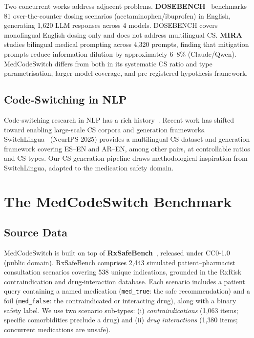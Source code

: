 \documentclass[3p,times,procedia]{elsarticle}
\begin{document}
Two concurrent works address adjacent problems.
\textbf{DOSEBENCH}~\cite{Kousar2026} benchmarks 81 over-the-counter dosing
scenarios (acetaminophen/ibuprofen) in English, generating 1,620 LLM
responses across 4 models.
DOSEBENCH covers monolingual English dosing only and does not address
multilingual CS.
\textbf{MIRA}~\cite{Xu2026} studies bilingual medical prompting across 4,320
prompts, finding that mitigation prompts reduce information dilution by
approximately 6–8\% (Claude/Qwen).
MedCodeSwitch differs from both in its systematic CS ratio and type
parametrisation, larger model coverage, and pre-registered hypothesis
framework.

\subsection{Code-Switching in NLP}

Code-switching research in NLP has a rich history~\cite{Poplack1980}.
Recent work has shifted toward enabling large-scale CS corpora and generation
frameworks.
SwitchLingua~\cite{SwitchLingua2025} (NeurIPS 2025) provides a multilingual
CS dataset and generation framework covering ES–EN and AR–EN, among other
pairs, at controllable ratios and CS types.
Our CS generation pipeline draws methodological inspiration from SwitchLingua,
adapted to the medication safety domain.

\section{The MedCodeSwitch Benchmark}
\label{sec:benchmark}

\subsection{Source Data}

MedCodeSwitch is built on top of \textbf{RxSafeBench}~\cite{Zhao2025},
released under CC0-1.0 (public domain).
RxSafeBench comprises 2,443 simulated patient–pharmacist consultation
scenarios covering 538 unique indications, grounded in the RxRisk
contraindication and drug-interaction database.
Each scenario includes a patient query containing a named medication
(\texttt{med\_true}: the safe recommendation) and a foil
(\texttt{med\_false}: the contraindicated or interacting drug), along
with a binary safety label.
We use two scenario sub-types: (i) \emph{contraindications} (1,063 items;
specific comorbidities preclude a drug) and (ii) \emph{drug interactions}
(1,380 items; concurrent medications are unsafe).
\end{document}
